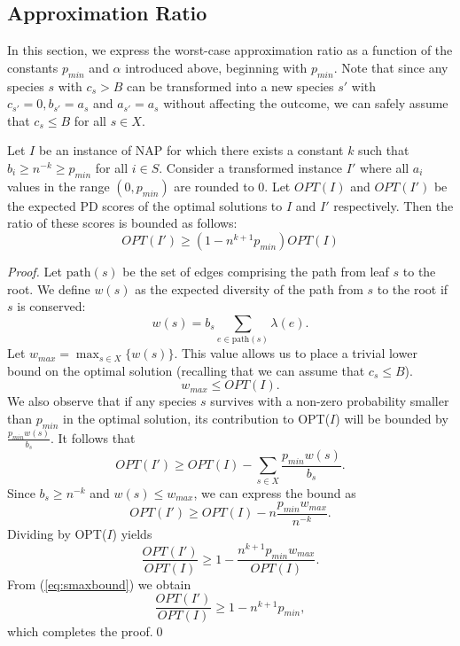 \documentclass[10pt]{llncs}       \usepackage{graphicx,subfigure}
\begin{document}
\subsection{Approximation Ratio}
In this section, we express the worst-case approximation ratio as a function 
of the constants $p_{min}$ and $\alpha$ introduced above, 
beginning with $p_{min}$.  Note that 
since any species $s$ with $c_s > B$ can be 
transformed into a new species $s'$ with $c_{s'} = 0, b_{s'} = a_s$ and
$a_{s'} = a_s$ without
affecting the outcome, we can safely assume that $c_s \leq B$ for all 
$s \in X$. 
\begin{lemma}
  \label{lem:pmin}
Let $I$ be an instance of NAP for which there exists a constant $k$ such
that $b_i \geq n^{-k} \geq p_{min}$ for all $i \in S$. Consider 
a transformed instance $I'$ where
all $a_i$ values in the range $(0, p_{min})$ are rounded to 0. Let $OPT(I)$ 
and $OPT(I')$ be the expected PD scores of the optimal solutions to $I$ and
$I'$ respectively. Then
the ratio of these scores is bounded as follows: 
\begin{equation*}
OPT(I') \geq (1 - n^{k+1}p_{min})OPT(I)  
\end{equation*}
\end{lemma}
\begin{proof}
Let $\text{path}(s)$ be the set of edges comprising the path from leaf $s$ to
the root.  We define $w(s)$ as the expected diversity of the path from $s$
to the root if $s$ is conserved:
\begin{equation*}
  w(s) =  b_s \sum_{e \in \text{path}(s)}\lambda(e).
\end{equation*}
Let $w_{max} = \max_{s \in X}\{w(s)\}$.  
This value allows us to place a trivial lower bound on the optimal solution
(recalling that we can assume that $c_s \leq B$).
\begin{equation}
\label{eq:smaxbound}
  w_{max} \leq OPT(I).
\end{equation}
We also observe that if any species $s$ survives with a non-zero probability
smaller than $p_{min}$ in the optimal solution, its contribution to OPT($I$)
will be bounded by $\displaystyle\frac{p_{min} w(s)}{b_s}$.  It follows that 
\begin{equation*}
  OPT(I') \geq OPT(I) - \sum_{s \in X}\frac{p_{min} w(s)}{b_s}.
\end{equation*}
Since $b_s \geq n^{-k}$ and $w(s) \leq w_{max}$, we can 
express the bound as
\begin{equation*}
  OPT(I') \geq OPT(I) - n \frac{p_{min} w_{max}}{n^{-k}}.
\end{equation*} 
Dividing by OPT($I$) yields
\begin{equation*}
  \frac{OPT(I')}{OPT(I)} \geq 1 - \frac{n^{k+1} p_{min} w_{max}}{OPT(I)}.
\end{equation*}
From (\ref{eq:smaxbound}) we obtain
\begin{equation*}
  \frac{OPT(I')}{OPT(I)} \geq 1 - n^{k+1} p_{min}, 
\end{equation*}
which completes the proof.\qed
\end{proof}
\end{document}
